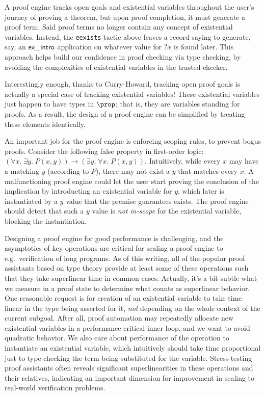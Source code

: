 \documentclass{amsbook}
\theoremstyle{definition}
\theoremstyle{remark}
\numberwithin{section}{chapter}
\numberwithin{equation}{chapter}
\begin{document}
A proof engine tracks open goals and existential variables throughout the user's journey of proving a theorem, but upon proof completion, it must generate a proof term.
Said proof terms no longer contain any concept of existential variables.
Instead, the \texttt{eexists} tactic above leaves a record saying to generate, say, an $\mathsf{ex\_intro}$ application on whatever value for $?x$ is found later.
This approach helps build our confidence in proof checking via type checking, by avoiding the complexities of existential variables in the trusted checker.

Interestingly enough, thanks to Curry-Howard, tracking open proof goals is actually a special case of tracking existential variables!
These existential variables just happen to have types in $\prop$; that is, they are variables standing for proofs.
As a result, the design of a proof engine can be simplified by treating these elements identically.

An important job for the proof engine is enforcing scoping rules, to prevent bogus proofs.
Consider the following false property in first-order logic: $(\forall x. \; \exists y. \; P(x, y)) \to (\exists y. \; \forall x. \; P(x, y))$.
Intuitively, while every $x$ may have a matching $y$ (according to $P$), there may not exist a $y$ that matches every $x$.
A malfunctioning proof engine could let the user start proving the conclusion of the implication by introducting an existential variable for $y$, which later is instantiated by a $y$ value that the premise guarantees exists.
The proof engine should detect that such a $y$ value is \emph{not in-scope} for the existential variable, blocking the instantiation.

Designing a proof engine for good performance is challenging, and the asymptotics of key operations are critical for scaling a proof engine to e.g.\ verification of long programs.
As of this writing, all of the popular proof assistants based on type theory provide at least some of these operations such that they take superlinear time in common cases.
Actually, it's a bit subtle what we measure in a proof state to determine what counts as superlinear behavior.
One reasonable request is for creation of an existential variable to take time linear in the type being asserted for it, \emph{not} depending on the whole context of the current subgoal.
After all, proof automation may repeatedly allocate new existential variables in a performance-critical inner loop, and we want to avoid quadratic behavior.
We also care about performance of the operation to instantiate an existential variable, which intuitively should take time proportional just to type-checking the term being substituted for the variable.
Stress-testing proof assistants often reveals significant superlinearities in these operations and their relatives, indicating an important dimension for improvement in scaling to real-world verification problems.
\end{document}
